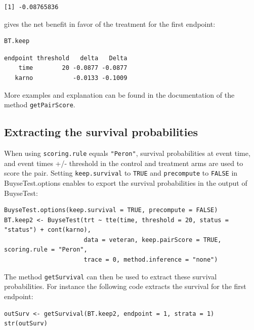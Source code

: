 \documentclass[12pt]{article}
\begin{document}
\begin{verbatim}
[1] -0.08765836
\end{verbatim}


gives the net benefit in favor of the treatment for the first
endpoint:
\lstset{language=r,label= ,caption= ,captionpos=b,numbers=none}
\begin{lstlisting}
BT.keep
\end{lstlisting}

\begin{verbatim}
endpoint threshold   delta   Delta
    time        20 -0.0877 -0.0877
   karno           -0.0133 -0.1009
\end{verbatim}


More examples and explanation can be found in the documentation of
the method \texttt{getPairScore}.

\subsection{Extracting the survival probabilities}
\label{sec:orgabbd7b0}
When using \texttt{scoring.rule} equals \texttt{"Peron"}, survival probabilities at
event time, and event times +/- threshold in the control and treatment
arms are used to score the pair. Setting \texttt{keep.survival} to \texttt{TRUE} and
\texttt{precompute} to \texttt{FALSE} in BuyseTest.options enables to export the
survival probabilities in the output of BuyseTest:
\lstset{language=r,label= ,caption= ,captionpos=b,numbers=none}
\begin{lstlisting}
BuyseTest.options(keep.survival = TRUE, precompute = FALSE)
BT.keep2 <- BuyseTest(trt ~ tte(time, threshold = 20, status = "status") + cont(karno),
                      data = veteran, keep.pairScore = TRUE, scoring.rule = "Peron",
                      trace = 0, method.inference = "none")
\end{lstlisting}

The method \texttt{getSurvival} can then be used to extract these survival
probabilities. For instance the following code extracts the survival
for the first endpoint:
\lstset{language=r,label= ,caption= ,captionpos=b,numbers=none}
\begin{lstlisting}
outSurv <- getSurvival(BT.keep2, endpoint = 1, strata = 1)
str(outSurv)
\end{lstlisting}
\end{document}
